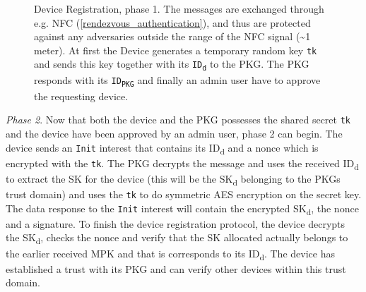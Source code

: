 \begin{figure}[ht]
  \centering
  \caption[Device Registration, phase 1]{Device Registration, phase 1.
  The messages are exchanged through e.g. NFC (\autoref{rendezvous_authentication}), and thus are protected against any adversaries outside the range of the NFC signal (\textasciitilde{1} meter).
  At first the Device generates a temporary random key \texttt{tk} and sends this key together with its \texttt{ID\textsubscript{d}} to the PKG. 
  The PKG responds with its \texttt{ID\textsubscript{PKG}} and finally an admin user have to approve the requesting device. 
  }
  \label{fig:init_ibe_1}
\end{figure}

\textit{Phase 2}.
Now that both the device and the \gls{PKG} possesses the shared secret \texttt{tk} and the device have been approved by an admin user, phase 2 can begin.
The device sends an \texttt{Init} \gls{interest} that contains its ID\textsubscript{d} and a nonce which is encrypted with the \texttt{tk}.
The \gls{PKG} decrypts the message and uses the received ID\textsubscript{d} to extract the \gls{SK} for the device (this will be the \gls{SK}\textsubscript{d} belonging to the \gls{PKG}s trust domain) and uses the \texttt{tk} to do symmetric \gls{AES} encryption on the secret key. 
The \gls{data} response to the \texttt{Init} \gls{interest} will contain the encrypted \gls{SK}\textsubscript{d}, the nonce and a signature.
To finish the device registration protocol, the device decrypts the \gls{SK}\textsubscript{d}, checks the nonce and verify that the \gls{SK} allocated actually belongs to the earlier received \gls{MPK} and that is corresponds to its \gls{ID}\textsubscript{d}.
The device has established a trust with its \gls{PKG} and can verify other devices within this trust domain. 

